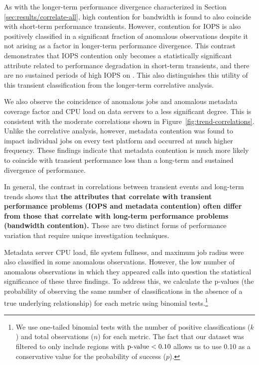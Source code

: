 As with the longer-term performance divergence characterized in Section \ref{sec:results/correlate-all}, high contention for bandwidth is found to also coincide with short-term performance transients.
However, contention for IOPS is also positively classified in a significant fraction of anomalous observations despite it not arising as a factor in longer-term performance divergence.
This contrast demonstrates that IOPS contention only becomes a statistically significant attribute related to performance degradation in short-term transients, and there are no sustained periods of high IOPS on \mirafsone.
This also distinguishes this utility of this transient classification from
the longer-term correlative analysis.

We also observe the coincidence of anomalous jobs and anomalous metadata coverage factor and CPU load on
data servers to a less significant degree.  This is
consistent with the moderate correlations shown in
Figure~\ref{fig:trend-correlations}.
Unlike the correlative analysis, however, metadata contention was found to impact individual jobs on every test platform and occurred at much higher frequency.
These findings indicate that metadata contention is much more likely to coincide with transient performance loss than a long-term and sustained divergence of performance.

In general, the contrast in correlations between transient events and
long-term trends shows that \textbf{the attributes that correlate with transient
performance problems (IOPS and
  metadata contention) often differ from those that correlate with
    long-term performance problems (bandwidth contention).} These are two distinct forms of performance variation that
require unique investigation techniques.

Metadata server CPU load, file system fullness, and maximum job radius were also classified in some anomalous observations.
However, the low number of anomalous observations in which they appeared calls into question the statistical significance of these three findings.
To address this, we calculate the p-values (the probability of observing the same number of classifications in the absence of a true underlying relationship) for each metric using binomial tests.\footnote{
We use one-tailed binomial tests with the number of positive classifications ($k$) and total observations ($n$) for each metric.
The fact that our dataset was filtered to only include regions with ${\textup{p-value} < 0.10}$ allows us to use 0.10 as a conservative value for the probability of success ($p$).}

